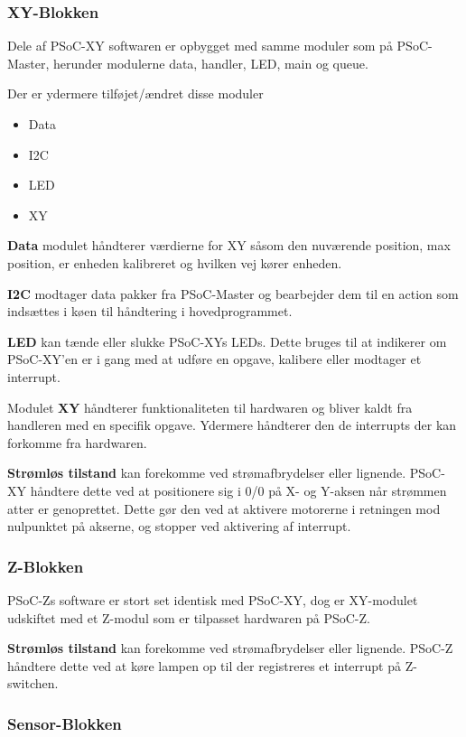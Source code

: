 \subsubsection{XY-Blokken}

Dele af PSoC-XY softwaren er opbygget med samme moduler som på PSoC-Master, herunder modulerne data, handler, LED, main og queue.

Der er ydermere tilføjet/ændret disse moduler
\begin{itemize}
    \item Data
    \item I2C
    \item LED
    \item XY
\end{itemize}

\textbf{Data} modulet håndterer værdierne for XY såsom den nuværende position, max position, er enheden kalibreret og hvilken vej kører enheden.

\textbf{I2C} modtager data pakker fra PSoC-Master og bearbejder dem til en action som indsættes i køen til håndtering i hovedprogrammet.

\textbf{LED} kan tænde eller slukke PSoC-XYs LEDs. Dette bruges til at indikerer om PSoC-XY'en er i gang med at udføre en opgave, kalibere eller modtager et interrupt.

Modulet \textbf{XY} håndterer funktionaliteten til hardwaren og bliver kaldt fra handleren med en specifik opgave. Ydermere håndterer den de interrupts der kan forkomme fra hardwaren. 

\textbf{Strømløs tilstand} kan forekomme ved strømafbrydelser eller lignende. PSoC-XY håndtere dette ved at positionere sig i 0/0 på X- og Y-aksen når strømmen atter er genoprettet. Dette gør den ved at aktivere motorerne i retningen mod nulpunktet på akserne, og stopper ved aktivering af interrupt. 

\subsubsection{Z-Blokken}

PSoC-Zs software er stort set identisk med PSoC-XY, dog er XY-modulet udskiftet med et Z-modul som er tilpasset hardwaren på PSoC-Z.

\textbf{Strømløs tilstand} kan forekomme ved strømafbrydelser eller lignende. PSoC-Z håndtere dette ved at køre lampen op til der registreres et interrupt på Z-switchen.

\subsubsection{Sensor-Blokken}


